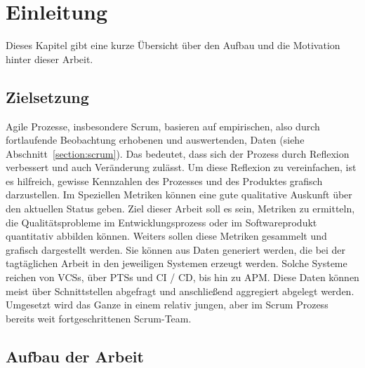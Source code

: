 \chapter{Einleitung}

Dieses Kapitel gibt eine kurze Übersicht über den Aufbau und die Motivation hinter dieser Arbeit.

\section{Zielsetzung}

Agile Prozesse, insbesondere Scrum, basieren auf empirischen, also durch fortlaufende Beobachtung erhobenen und auswertenden, Daten (siehe Abschnitt~\ref{section:scrum}).
Das bedeutet, dass sich der Prozess durch Reflexion verbessert und auch Veränderung zulässt.
Um diese Reflexion zu vereinfachen, ist es hilfreich, gewisse Kennzahlen des Prozesses und des Produktes grafisch darzustellen.
Im Speziellen Metriken können eine gute qualitative Auskunft über den aktuellen Status geben.
Ziel dieser Arbeit soll es sein, Metriken zu ermitteln, die Qualitätsprobleme im Entwicklungsprozess oder im Softwareprodukt quantitativ abbilden können.
Weiters sollen diese Metriken gesammelt und grafisch dargestellt werden.
Sie können aus Daten generiert werden, die bei der tagtäglichen Arbeit in den jeweiligen Systemen erzeugt werden.
Solche Systeme reichen von \acfp{VCS}, über \acfp{PTS} und \acf{CI} / \acf{CD}, bis hin zu \acf{APM}.
Diese Daten können meist über Schnittstellen abgefragt und anschließend aggregiert abgelegt werden.
Umgesetzt wird das Ganze in einem relativ jungen, aber im Scrum Prozess bereits weit fortgeschrittenen Scrum-Team.

\clearpage
\section{Aufbau der Arbeit}

